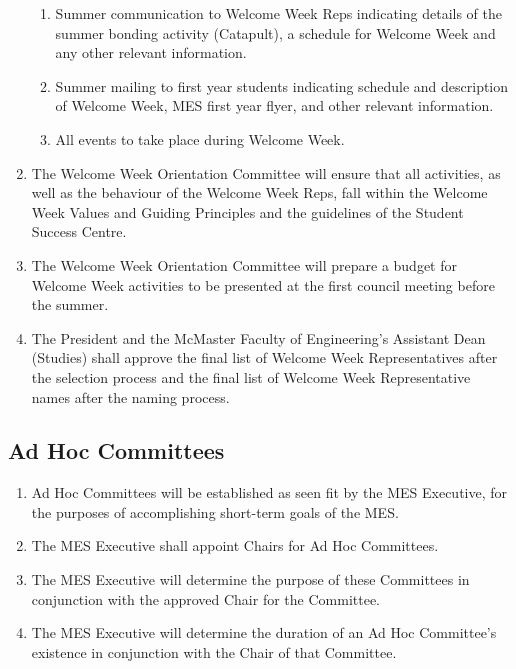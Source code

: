 \begin{enumerate}
  \begin{enumerate}
   \item
    Summer communication to Welcome Week Reps indicating details of the
    summer bonding activity (Catapult), a schedule for Welcome Week and
    any other relevant information.
   \item
    Summer mailing to first year students indicating schedule and
    description of Welcome Week, MES first year flyer, and other
    relevant information.
   \item
    All events to take place during Welcome Week.
  \end{enumerate}
 \item
  The Welcome Week Orientation Committee will ensure that all
  activities, as well as the behaviour of the Welcome Week Reps, fall
  within the Welcome Week Values and Guiding Principles and the
  guidelines of the Student Success Centre.
 \item
  The Welcome Week Orientation Committee will prepare a budget for
  Welcome Week activities to be presented at the first council meeting
  before the summer.
 \item
  The President and the McMaster Faculty of Engineering's Assistant Dean
  (Studies) shall approve the final list of Welcome Week Representatives
  after the selection process and the final list of Welcome Week
  Representative names after the naming process.

\end{enumerate}

\hypertarget{ad-hoc-committees}{%
 \subsection{\texorpdfstring{Ad Hoc Committees
  }{Ad Hoc Committees }}
 \label{ad-hoc-committees}}
\begin{enumerate}
 \item
  Ad Hoc Committees will be established as seen fit by the MES
  Executive, for the purposes of accomplishing short-term goals of the
  MES.
 \item
  The MES Executive shall appoint Chairs for Ad Hoc Committees.
 \item
  The MES Executive will determine the purpose of these Committees in
  conjunction with the approved Chair for the Committee.
 \item
  The MES Executive will determine the duration of an Ad Hoc Committee's
  existence in conjunction with the Chair of that Committee.

\end{enumerate}

